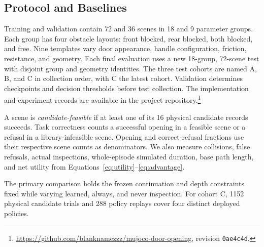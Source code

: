 \subsection{Protocol and Baselines}
Training and validation contain 72 and 36 scenes in 18 and 9 parameter groups.
Each group has four obstacle layouts: front blocked, rear blocked, both
blocked, and free. Nine templates vary door appearance, handle configuration,
friction, resistance, and geometry. Each final evaluation uses a new
18-group, 72-scene test with disjoint group and geometry identities.
The three test cohorts are named A, B, and C in collection order, with C the
latest cohort.
Validation determines checkpoints and decision thresholds before test
collection. The implementation and experiment records are available in
the project repository.\footnote{\url{https://github.com/blanknamezzz/mujoco-door-opening},
revision \texttt{0ae4c4d}.}

A scene is \emph{candidate-feasible} if at least one of its 16 physical
candidate records succeeds. Task correctness counts a successful opening in
a feasible scene or a refusal in a library-infeasible scene. Opening and
correct-refusal fractions use their respective scene counts as denominators.
We also measure collisions, false refusals, actual inspections, whole-episode
simulated duration, base path length, and net utility from
Equations~\ref{eq:utility}--\ref{eq:advantage}.

The primary comparison holds the frozen continuation and depth constraints
fixed while varying learned, always, and never inspection. For cohort C,
1152 physical candidate trials and 288 policy replays cover four
distinct deployed policies.
